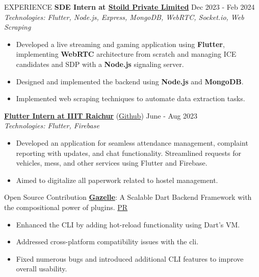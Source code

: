 \documentclass{resume}
\begin{document}
\begin{rSection}{EXPERIENCE}
    \textbf{SDE Intern at \href{https://stoild.in/}{Stoild Private Limited}} \hfill Dec 2023 - Feb 2024\\
    \textit{Technologies: Flutter, Node.js, Express, MongoDB, WebRTC, Socket.io, Web Scraping}
    \begin{itemize}
        \itemsep -3pt {}
        \item Developed a live streaming and gaming application using \textbf{Flutter}, implementing \textbf{WebRTC} architecture from scratch and managing ICE candidates and SDP with a \textbf{Node.js} signaling server.
        \item Designed and implemented the backend using \textbf{Node.js} and \textbf{MongoDB}.
        \item Implemented web scraping techniques to automate data extraction tasks.
    \end{itemize}

    \textbf{\href{https://drive.google.com/file/d/16NqRxg5LFhZu0WkdqG3z83XnLyf5P2UO/view?usp=sharing}{Flutter Intern at IIIT Raichur}} (\href{https://github.com/ShivanshuKGupta/hustle_stay}{Github}) \hfill June - Aug 2023\\
    \textit{Technologies: Flutter, Firebase}
    \begin{itemize}
        \itemsep -3pt {}
        \item Developed an application for seamless attendance management, complaint reporting with updates, and chat functionality. Streamlined requests for vehicles, mess, and other services using Flutter and Firebase.
        \item Aimed to digitalize all paperwork related to hostel management.
    \end{itemize}

\end{rSection}


\begin{rSection}{Open Source Contribution}
    \textbf{\href{https://docs.gazelle-dart.dev/}{Gazelle}}: A Scalable Dart Backend Framework with the compositional power of plugins. \hfill \href{https://github.com/intales/gazelle/commits?author=ShivanshuKGupta}{PR}
    \begin{itemize}
        \item Enhanced the CLI by adding hot-reload functionality using Dart's VM.
        \item Addressed cross-platform compatibility issues with the cli.
        \item Fixed numerous bugs and introduced additional CLI features to improve overall usability.
    \end{itemize}
\end{rSection}
\end{document}
